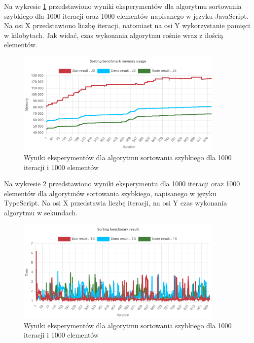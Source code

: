 Na wykresie \ref{fig:quick_sorting_e3_memory_js} przedstawiono wyniki eksperymentów dla algorytmu sortowania szybkiego dla 1000 iteracji oraz 1000 elementów napisanego w języku JavaScript. Na osi X przedstawiono liczbę iteracji, natomiast na osi Y wykorzystanie pamięci w kilobytach. Jak widać, czas wykonania algorytmu rośnie wraz z ilością elementów.
\begin{figure}[H]
  \centering
  \includegraphics[width=0.9\textwidth]{Figures/sorting/quick/e3_memory_js.png}
  \caption{Wyniki eksperymentów dla algorytmu sortowania szybkiego dla 1000 iteracji i 1000 elementów}
  \label{fig:quick_sorting_e3_memory_js}
\end{figure}

Na wykresie \ref{fig:quick_sorting_e3_ts} przedstawiono wyniki eksperymentu dla 1000 iteracji oraz 1000 elementów dla algorytmów sortowania szybkiego, napisanego w języku TypeScript. Na osi X przedstawia liczbę iteracji, na osi Y czas wykonania algorytmu w sekundach. 

\begin{figure}[H]
  \centering
  \includegraphics[width=0.9\textwidth]{Figures/sorting/quick/e3_ts.png}
  \caption{Wyniki eksperymentów dla algorytmu sortowania szybkiego dla 1000 iteracji i 1000 elementów}
  \label{fig:quick_sorting_e3_ts}
\end{figure}

